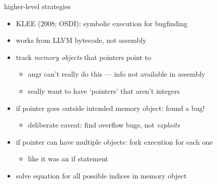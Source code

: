 \begin{frame}{higher-level strategies}
    \begin{itemize}
    \item KLEE (2008; OSDI): symbolic execution for bugfinding
    \item works from LLVM bytecode, not assembly
    \vspace{.5cm}
    \item track \textit{memory objects} that pointers point to
        \begin{itemize}
        \item angr can't really do this --- info not available in assembly
        \item really want to have `pointers' that aren't integers
        \end{itemize}
    \item if pointer goes outside intended memory object: found a bug!
        \begin{itemize}
        \item deliberate caveat: find overflow bugs, not \textit{exploits}
        \end{itemize}
    \item if pointer can have multiple objects: fork execution for each one
        \begin{itemize}
        \item like it was an if statement
        \end{itemize}
    \item solve equation for all possible indices in memory object
    \end{itemize}
\end{frame}
